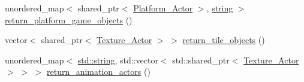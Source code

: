 \begin{DoxyCompactItemize}
unordered\+\_\+map$<$ shared\+\_\+ptr$<$ \hyperlink{classPlatform__Actor}{Platform\+\_\+\+Actor} $>$, \hyperlink{imgui__impl__opengl3__loader_8h_ac83513893df92266f79a515488701770}{string} $>$ \hyperlink{classLoadingGameObjects_aab403109bbc6de5e4a1260da3f97d510}{return\+\_\+platform\+\_\+game\+\_\+objects} ()
\item 
vector$<$ shared\+\_\+ptr$<$ \hyperlink{classTexture__Actor}{Texture\+\_\+\+Actor} $>$ $>$ \hyperlink{classLoadingGameObjects_a42e1f967d18419464e3187ccc20ff836}{return\+\_\+tile\+\_\+objects} ()
\item 
unordered\+\_\+map$<$ \hyperlink{imgui__impl__opengl3__loader_8h_ac83513893df92266f79a515488701770}{std\+::string}, std\+::vector$<$ std\+::shared\+\_\+ptr$<$ \hyperlink{classTexture__Actor}{Texture\+\_\+\+Actor} $>$ $>$ $>$ \hyperlink{classLoadingGameObjects_a859cee055c28c3fc03500496f077598a}{return\+\_\+animation\+\_\+actors} ()
\end{DoxyCompactItemize}
